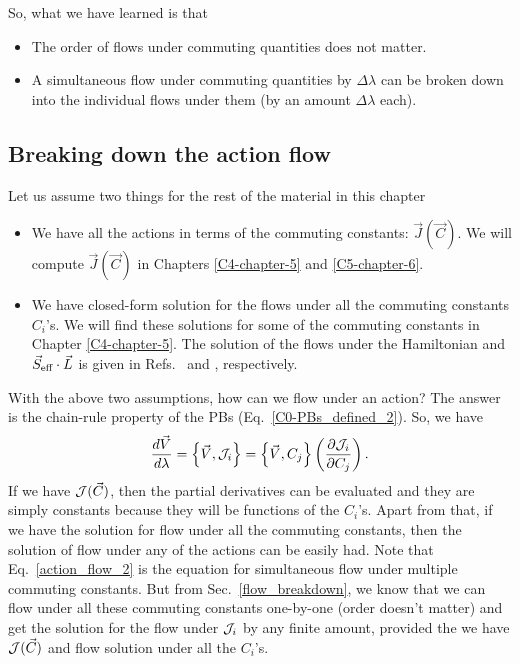 So, what we have learned is that  \\
\begin{tcolorbox}
\begin{itemize}
\item The order of flows under commuting quantities does not matter.
\item A simultaneous flow under commuting quantities 
by $\Delta \lambda$ can be broken down into the individual flows under them (by an amount $\Delta \lambda$ each).
\end{itemize}
\end{tcolorbox}








\subsection{Breaking down the action flow}      \label{action_flow_breakdown}



\begin{tcolorbox}
Let us assume two things for the rest of the material in this chapter
\begin{itemize}
\item We have all the actions in terms of the 
commuting constants: $\vec{J}(\vec{C})$. 
We will compute $\vec{J}(\vec{C})$ in Chapters \ref{C4-chapter-5}
and \ref{C5-chapter-6}.
\item We have closed-form solution for the flows under all the commuting
constants $C_i$'s. We will find these solutions for some
of the commuting constants in Chapter \ref{C4-chapter-5}.
The solution of the flows under the Hamiltonian and $\vec{S}_{\text{eff}}\cdot \vec{L}$ 
is given in Refs.~\cite{Cho:2019brd} and \cite{tanay2021action}, 
respectively.
\end{itemize}
\end{tcolorbox}




With the above two assumptions, how 
can we flow under an action?
The answer is the chain-rule property of the PBs 
(Eq.~\eqref{C0-PBs_defined_2}). So, we have
\begin{equation}     \label{action_flow_2}
\frac{d \vec{V}}{d \lambda}=\left\{\vec{V}, \mathcal{J}_{i}\right\}=\left\{\vec{V}, C_{j}\right\}\left(\frac{\partial \mathcal{J}_{i}}{\partial C_{j}}\right).
\end{equation}
If we have $\mathcal{J}(\vec{C})$, then the partial derivatives can be evaluated and
they are simply constants because they will be functions of the $C_i$'s.
Apart from that, if we have the solution for flow under all the commuting 
constants, then the solution of flow under any of the actions
can be easily had. Note that Eq.~\eqref{action_flow_2} is the
equation for simultaneous flow under multiple commuting constants.
But from Sec.~\ref{flow_breakdown}, we know that we can flow under 
all these commuting 
constants one-by-one (order doesn't matter) and get the solution
for the flow under $\mathcal{J}_i$ by any finite amount, provided 
the we have $\mathcal{J}(\vec{C})$ and flow solution under all the $C_i$'s.






